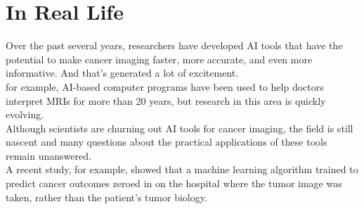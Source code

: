\documentclass{SBCbookchapter}
\begin{document}
\section*{In Real Life}
Over the past several years, researchers have developed AI tools that have the potential to make cancer imaging faster, more accurate, and even more informative. And that’s generated a lot of excitement. \\
for example, AI-based computer programs have been used to help doctors interpret MRIs for more than 20 years, but research in this area is quickly evolving. \\
Although scientists are churning out AI tools for cancer imaging, the field is still nascent and many questions about the practical applications of these tools remain unanswered. \\
A recent study, for example, showed that a machine learning algorithm trained to predict cancer outcomes zeroed in on the hospital where the tumor image was taken, rather than the patient’s tumor biology.
\end{document}
